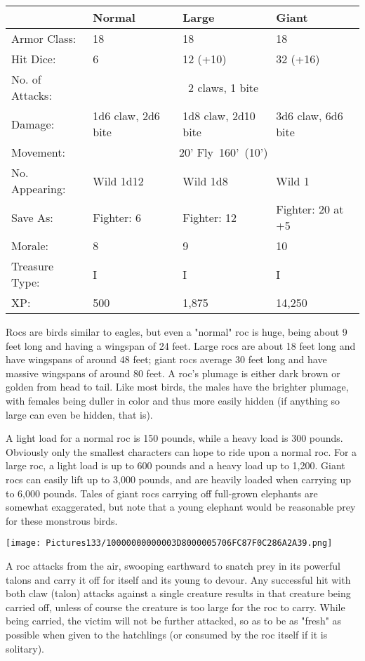 \documentclass[a4paper,twoside,openany,10pt]{book}
\begin{document}
\begin{multicols}{2}
\begin{tabularx}{0.50\textwidth}{@{}lXXX@{}}
& Normal & Large & Giant \\\hline
Armor Class: & 18 & 18 & 18 \\\hline
Hit Dice: & 6 & 12 (+10) & 32 (+16) \\\hline
No. of Attacks: &\multicolumn{3}{c}{2 claws, 1 bite} \\\hline
Damage: & 1d6 claw, 2d6 bite & 1d8 claw, 2d10 bite & 3d6 claw, 6d6 bite \\\hline
Movement: & \multicolumn{3}{c}{20' Fly~160'~(10')} \\\hline
No. Appearing: & Wild 1d12 & Wild 1d8 & Wild 1 \\\hline
Save As: & Fighter: 6 & Fighter: 12 & Fighter: 20 at +5 \\\hline
Morale: & 8 & 9 & 10 \\\hline
Treasure Type: & I & I & I \\\hline
XP: & 500 & 1,875 & 14,250 \\\hline
\end{tabularx}\medskip

Rocs are birds similar to eagles, but even a "normal" roc is huge, being about 9 feet long and having a wingspan of 24 feet. Large rocs are about 18 feet long and have wingspans of around 48 feet; giant rocs average 30 feet long and have massive wingspans of around 80 feet. A roc's plumage is either dark brown or golden from head to tail. Like most birds, the males have the brighter plumage, with females being duller in color and thus more easily hidden (if anything so large can even be hidden, that is).

A light load for a normal roc is 150 pounds, while a heavy load is 300 pounds. Obviously only the smallest characters can hope to ride upon a normal roc. For a large roc, a light load is up to 600 pounds and a heavy load up to 1,200.  Giant rocs can easily lift up to 3,000 pounds, and are heavily loaded when carrying up to 6,000 pounds. Tales of giant rocs carrying off full-grown elephants are somewhat exaggerated, but note that a young elephant would be reasonable prey for these monstrous birds. 


\begin{center} \texttt{[image: Pictures133/10000000000003D8000005706FC87F0C286A2A39.png]} \end{center}

A roc attacks from the air, swooping earthward to snatch prey in its powerful talons and carry it off for itself and its young to devour. Any successful hit with both claw (talon) attacks against a single creature results in that creature being carried off, unless of course the creature is too large for the roc to carry. While being carried, the victim will not be further attacked, so as to be as "fresh" as possible when given to the hatchlings (or consumed by the roc itself if it is solitary).


\end{multicols}
\end{document}
